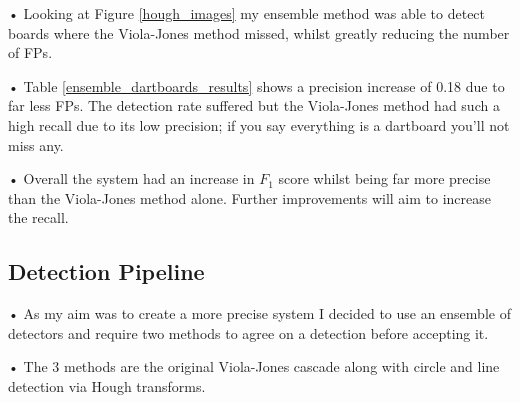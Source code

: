 \documentclass[11pt]{article}
\begin{document}


• Looking at Figure \ref{hough_images} my ensemble method was able to detect boards where the Viola-Jones method missed, whilst greatly reducing the number of FPs.


\noindent • Table \ref{ensemble_dartboards_results} shows a precision increase of 0.18 due to far less FPs. The detection rate suffered but the Viola-Jones method had such a high recall due to its low precision; if you say everything is a dartboard you'll not miss any.


\noindent • Overall the system had an increase in $F_1$ score whilst being far more precise than the Viola-Jones method alone. Further improvements will aim to increase the recall.

\subsection{Detection Pipeline}




\noindent • As my aim was to create a more precise system I decided to use an ensemble of detectors and require two methods to agree on a detection before accepting it.


\noindent • The 3 methods are the original Viola-Jones cascade along with circle and line detection via Hough transforms.

\end{document}
